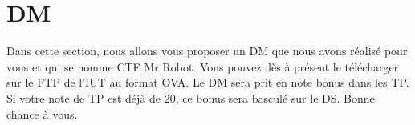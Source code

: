 \chapter{DM}

Dans cette section, nous allons vous proposer un DM que nous avons réalisé pour vous et qui se nomme CTF Mr Robot. Vous pouvez dès à présent le télécharger sur le FTP de l'IUT au format OVA. Le DM sera prit en note bonus dans les TP. Si votre note de TP est déjà de 20, ce bonus sera basculé sur le DS. Bonne chance à vous.